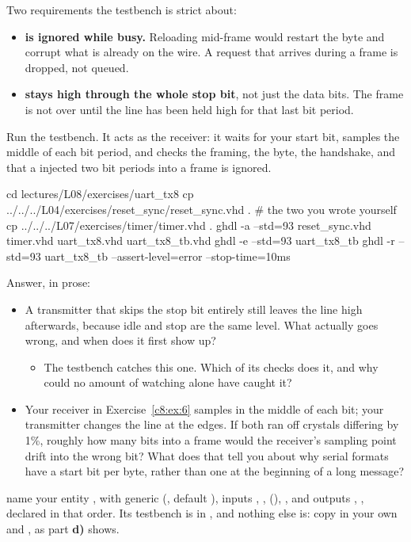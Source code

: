 \begin{parts}
    Two requirements the testbench is strict about:
    \begin{itemize}
      \item \textbf{ is ignored while busy.} Reloading mid-frame would restart the byte
        and corrupt what is already on the wire. A request that arrives during a frame is dropped,
        not queued.
      \item \textbf{ stays high through the whole stop bit}, not just the data bits. The
        frame is not over until the line has been held high for that last bit period.
    \end{itemize}
  \item Run the testbench. It acts as the receiver: it waits for your start bit, samples the middle
    of each bit period, and checks the framing, the byte, the  handshake, and that a
     injected two bit periods into a frame is ignored.

\begin{shell}
cd lectures/L08/exercises/uart_tx8
cp ../../../L04/exercises/reset_sync/reset_sync.vhd .     # the two you wrote yourself
cp ../../../L07/exercises/timer/timer.vhd .
ghdl -a --std=93 reset_sync.vhd timer.vhd uart_tx8.vhd uart_tx8_tb.vhd
ghdl -e --std=93 uart_tx8_tb
ghdl -r --std=93 uart_tx8_tb --assert-level=error --stop-time=10ms
\end{shell}
  \item Answer, in prose:
    \begin{itemize}
      \item A transmitter that skips the stop bit entirely still leaves the line high afterwards,
        because idle and stop are the same level. What actually goes wrong, and when does it first
        show up?
        \begin{itemize}
          \item The testbench catches this one. Which of its checks does it, and why could no
            amount of watching  alone have caught it?
        \end{itemize}
      \item Your receiver in Exercise~\ref{c8:ex:6} samples in the middle of each bit; your
        transmitter changes the line at the edges. If both ran off crystals differing by 1\%,
        roughly how many bits into a frame would the receiver's sampling point drift into the wrong
        bit? What does that tell you about why serial formats have a start bit per byte, rather than
        one at the beginning of a long message?
    \end{itemize}
\end{parts}


\selfcheck name your entity , with generic  (,
default ), inputs , , 
(), , and outputs , , declared in
that order. Its testbench is in , and nothing else is: copy in your own
 and , as part \textbf{d)} shows.
